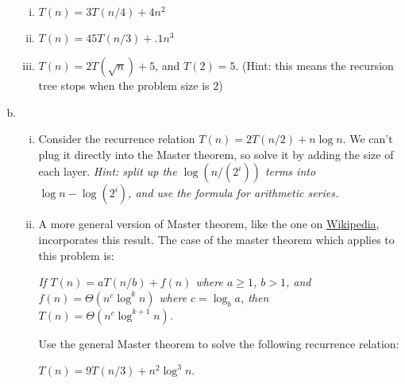 \begin{qunlist}
\begin{enumerate}[(a)]
\begin{enumerate}[(i)]
\item $T(n) = 3T(n/4) + 4n^2$\\
\item $T(n) = 45T(n/3) + .1n^3$\\
\item $T(n) = 2T(\sqrt{n}) + 5$, and $T(2) = 5$. (Hint: this means the recursion tree stops when the problem size is $2$)
\end{enumerate}
\item
{}
\begin{enumerate}[(i)]
\item Consider the recurrence relation $T(n) = 2T(n/2) + n \log n$. We can't plug it directly into the Master theorem, so solve it by adding the size of each layer.
\textit{Hint: split up the $\log (n/(2^i))$ terms into $\log n - \log (2^i)$, and use the formula for arithmetic series.}\\


\item A more general version of Master theorem, like the one on \href{https://en.wikipedia.org/wiki/Master_theorem}{Wikipedia}, incorporates this result. The case of the master theorem which applies to this problem is:

\textit{If $T(n) = aT(n/b) + f(n)$ where $a \geq 1$, $b > 1$, and $f(n) = \Theta(n^c \log^k n)$ where $c = \log_b a$, then $T(n) = \Theta(n^c \log^{k+1} n)$. }

Use the general Master theorem to solve the following recurrence relation:

$T(n) = 9T(n/3) + n^2 \log ^3 n$.


\end{enumerate}
\end{enumerate}
\end{qunlist}
